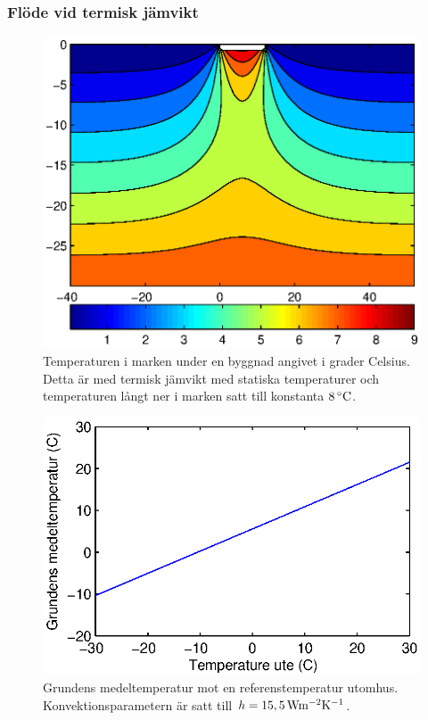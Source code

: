 \subsubsection{Flöde vid termisk jämvikt}

\begin{figure}
\centering
\includegraphics{images/groundheat.eps}
\caption{Temperaturen i marken under en byggnad angivet i grader Celsius. Detta är med termisk jämvikt
med statiska temperaturer och temperaturen långt ner i marken satt till konstanta $\unit[8]{^\circ C}$.}
\end{figure}

\begin{figure}
\centering
\includegraphics{images/groundtemperature.eps}
\caption{Grundens medeltemperatur mot en referenstemperatur utomhus. Konvektionsparametern är satt till
$h = \unit[15,5]{Wm^{-2}K^{-1}}$.}
\end{figure}
